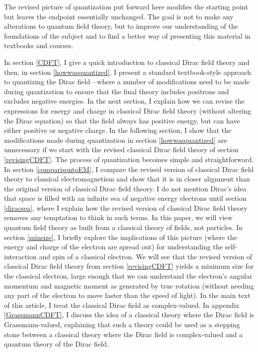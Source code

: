 \documentclass[12pt,secnumarabic,amsmath,amssymb,balancelastpage,nofootinbib]{article}
\begin{document}
The revised picture of quantization put forward here modifies the starting point but leaves the endpoint essentially unchanged.  The goal is not to make any alterations to quantum field theory, but to improve our understanding of the foundations of the subject and to find a better way of presenting this material in textbooks and courses.

In section \ref{CDFT}, I give a quick introduction to classical Dirac field theory and then, in section \ref{howwasquantized}, I present a standard textbook-style approach to quantizing the Dirac field---where a number of modifications need to be made during quantization to ensure that the final theory includes positrons and excludes negative energies.  In the next section, I explain how we can revise the expressions for energy and charge in classical Dirac field theory (without altering the Dirac equation) so that the field always has positive energy, but can have either positive or negative charge.  In the following section, I show that the modifications made during quantization in section \ref{howwasquantized} are unnecessary if we start with the revised classical Dirac field theory of section \ref{revisingCDFT}.  The process of quantization becomes simple and straightforward.  In section \ref{comparisontoEM}, I compare the revised version of classical Dirac field theory to classical electromagnetism and show that it is in closer alignment than the original version of classical Dirac field theory.  I do not mention Dirac's idea that space is filled with an infinite sea of negative energy electrons until section \ref{diracsea}, where I explain how the revised version of classical Dirac field theory removes any temptation to think in such terms.  In this paper, we will view quantum field theory as built from a classical theory of fields, not particles.  In section \ref{minsize}, I briefly explore the implications of this picture (where the energy and charge of the electron are spread out) for understanding the self-interaction and spin of a classical electron.  We will see that the revised version of classical Dirac field theory from section \ref{revisingCDFT} yields a minimum size for the classical electron, large enough that we can understand the electron's angular momentum and magnetic moment as generated by true rotation (without needing any part of the electron to move faster than the speed of light).  In the main text of this article, I treat the classical Dirac field as complex-valued.  In appendix \ref{GrassmannCDFT}, I discuss the idea of a classical theory where the Dirac field is Grassmann-valued, explaining that such a theory could be used as a stepping stone between a classical theory where the Dirac field is complex-valued and a quantum theory of the Dirac field.
\end{document}
